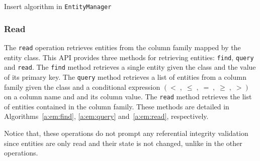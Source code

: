 		 
		 
		 		 \begin{algorithm}[h]
		 	\small
		 	\caption{Insert algorithm in \texttt{EntityManager}}\label{a:em:insert}
			
		 \end{algorithm}
		

			
		\subsubsection{Read}
		The  \texttt{read} operation retrieves  entities from the column family mapped
		by the entity class.		
		This \ac{API} provides three methods for retrieving entities: \texttt{find},
		\texttt{query} and \texttt{read}. The \texttt{find} method retrieves a single
		entity given the class and the value of its primary key. The \texttt{query}
		method retrieves a list of entities from a column family given the class and a
		conditional expression $\left(< \;,\; \leq\;,\;=\;,\;\geq\;,\; > \right)$ on a
		column name and and its column value. The \texttt{read}  method retrieves
		 the list of entities contained in the column family. These methods are
		 detailed in Algorithms~\ref{a:em:find}, \ref{a:em:query} and~\ref{a:em:read},
		 respectively.  
		 
		 Notice that, these   operations do not prompt any referential
		  integrity validation since entities are only read and their state is not
		 changed,  unlike in the other operations.
		  

